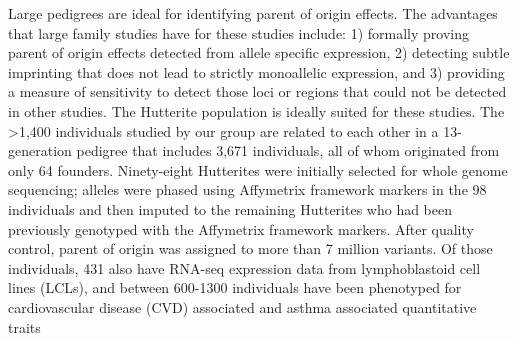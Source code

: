 Large pedigrees are ideal for identifying parent of origin effects\cite{Baran:2015cx}. The advantages that large family studies have for these studies include: 1) formally proving parent of origin effects detected from allele specific expression, 2) detecting subtle imprinting that does not lead to strictly monoallelic expression, and 3) providing a measure of sensitivity to detect those loci or regions that could not be detected in other studies.\cite{Baran:2015cx} The Hutterite population is ideally suited for these studies. The >1,400 individuals studied by our group are related to each other in a 13-generation pedigree that includes 3,671 individuals, all of whom originated from only 64 founders. Ninety-eight Hutterites were initially selected for whole genome sequencing; alleles were phased using Affymetrix framework markers in the 98 individuals and then imputed to the remaining Hutterites who had been previously genotyped with the Affymetrix framework markers\cite{Livne2015}. After quality control, parent of origin was assigned to more than 7 million variants. Of those individuals, 431 also have RNA-seq expression data from lymphoblastoid cell lines (LCLs), and between 600-1300 individuals have been phenotyped for cardiovascular disease (CVD) associated  and asthma associated quantitative traits 